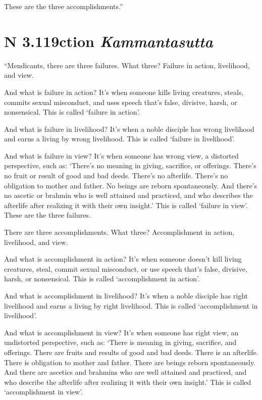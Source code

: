 \documentclass[12pt,openany]{book}%
\newcommand*{\suttatitleacronym}[1]{\smaller[2]{#1}\vspace*{.3em}}
\newcommand*{\suttatitletranslation}[1]{\linebreak{#1}}
\newcommand*{\suttatitleroot}[1]{\linebreak\smaller[2]\itshape{#1}}
\newcommand*{\tocacronym}[1]{\hspace*{-3.3em}{#1}\quad}
\newcommand*{\toctranslation}[1]{#1}
\newcommand*{\tocroot}[1]{(\textit{#1})}
\begin{document}
These are the three accomplishments.” 

%
\section*{{\suttatitleacronym AN 3.119}{\suttatitletranslation Action }{\suttatitleroot Kammantasutta}}
\addcontentsline{toc}{section}{\tocacronym{AN 3.119} \toctranslation{Action } \tocroot{Kammantasutta}}

“Mendicants, there are three failures. What three? Failure in action, livelihood, and view. 

And what is failure in action? It’s when someone kills living creatures, steals, commits sexual misconduct, and uses speech that’s false, divisive, harsh, or nonsensical. This is called ‘failure in action’. 

And what is failure in livelihood? It’s when a noble disciple has wrong livelihood and earns a living by wrong livelihood. This is called ‘failure in livelihood’. 

And what is failure in view? It’s when someone has wrong view, a distorted perspective, such as: ‘There’s no meaning in giving, sacrifice, or offerings. There’s no fruit or result of good and bad deeds. There’s no afterlife. There’s no obligation to mother and father. No beings are reborn spontaneously. And there’s no ascetic or brahmin who is well attained and practiced, and who describes the afterlife after realizing it with their own insight.’ This is called ‘failure in view’. These are the three failures. 

There are three accomplishments. What three? Accomplishment in action, livelihood, and view. 

And what is accomplishment in action? It’s when someone doesn’t kill living creatures, steal, commit sexual misconduct, or use speech that’s false, divisive, harsh, or nonsensical. This is called ‘accomplishment in action’. 

And what is accomplishment in livelihood? It’s when a noble disciple has right livelihood and earns a living by right livelihood. This is called ‘accomplishment in livelihood’. 

And what is accomplishment in view? It’s when someone has right view, an undistorted perspective, such as: ‘There is meaning in giving, sacrifice, and offerings. There are fruits and results of good and bad deeds. There is an afterlife. There is obligation to mother and father. There are beings reborn spontaneously. And there are ascetics and brahmins who are well attained and practiced, and who describe the afterlife after realizing it with their own insight.’ This is called ‘accomplishment in view’. 
\end{document}
